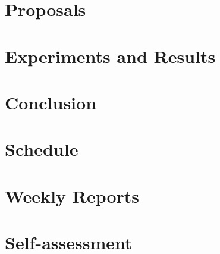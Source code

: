\documentclass[11pt, english, screen, research-development]{report-rd-info}
\begin{document}
\chapter{Proposals}


\chapter{Experiments and Results}
\label{chap:Experiments}

%

\chapter{Conclusion}
%






\appendix
%

%

%

%

\chapter{Schedule}



\chapter{Weekly Reports}



\chapter{Self-assessment}

\end{document}
